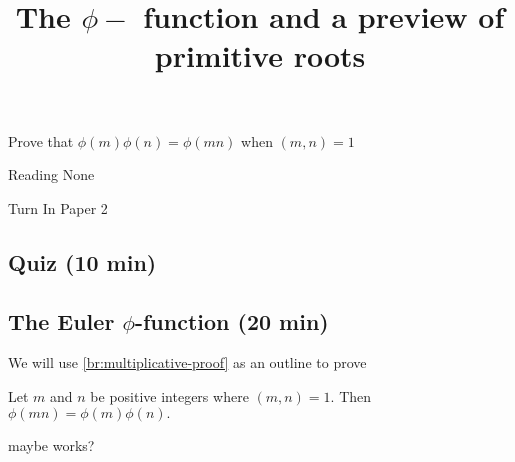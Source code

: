 \documentclass{ximera}
\title{The $\phi-$ function and a preview of primitive roots}
\begin{document}
\begin{abstract}
\end{abstract}
\maketitle


\begin{obj}
  \item Prove that $\phi(m)\phi(n)=\phi(mn)$ when $(m,n)=1$
\end{obj}


\begin{pre}
    \item[Reading] None
    \item[Turn In] Paper 2
\end{pre}

\subsection{Quiz (10 min)}

\subsection*{The Euler $\phi$-function (20 min)}

We will use \autoref{br:multiplicative-proof} as an outline to prove 

\begin{theorem}[Theorem 3.2]\label{thm:phi-multiplicative}
  Let $m$ and $n$ be positive integers where $(m,n)=1$. Then $\phi(mn)=\phi(m)\phi(n).$
\end{theorem}
maybe works?
\end{document}
